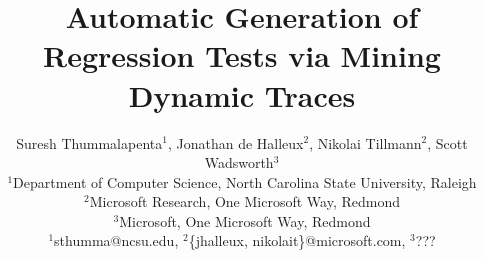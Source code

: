 \documentclass{sig-alternate}
\begin{document}
\title{Automatic Generation of Regression Tests via Mining Dynamic Traces}
%
%
%
%
%

%

\author{Suresh Thummalapenta$^1$, Jonathan de Halleux$^2$, Nikolai Tillmann$^2$, Scott Wadsworth$^3$\\
\small{$^1$Department of Computer Science, North Carolina State University, Raleigh}\\
\small{$^2$Microsoft Research, One Microsoft Way, Redmond}\\
\small{$^3$Microsoft, One Microsoft Way, Redmond}\\
\small{$^1$sthumma@ncsu.edu, $^2$\{jhalleux, nikolait\}@microsoft.com}, $^3$???\\
}
\end{document}
